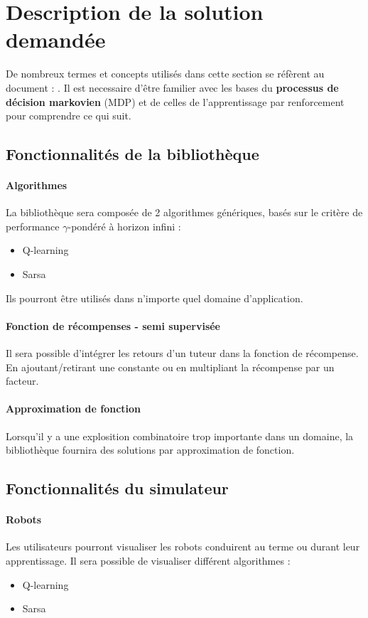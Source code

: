 \documentclass[a4paper,12pt]{article}
\begin{document}
  \vfill

  \newpage 
  \section{Description de la solution demandée}
	De nombreux termes et concepts utilisés dans cette section se réfèrent au document : \cite{PDMIA}. 
	Il est necessaire d'être familier avec les bases du \textbf{processus de décision markovien} (MDP) et de celles 
	de l'apprentissage par renforcement pour comprendre ce qui suit.
	\subsection{Fonctionnalités de la bibliothèque}
		\paragraph{Algorithmes} La bibliothèque sera composée de 2 algorithmes génériques, basés sur le critère 
		de performance $\gamma$-pondéré à horizon infini : 
		  \begin{itemize}
			  \item Q-learning
			  \item Sarsa
		  \end{itemize}
		 Ils pourront être utilisés dans n'importe quel domaine d'application.
		  
		\paragraph{Fonction de récompenses - semi supervisée} Il sera possible d'intégrer les retours d'un 
			tuteur dans la fonction de récompense. En ajoutant/retirant une constante 
			ou en multipliant la récompense par un facteur.
		\paragraph{Approximation de fonction} Lorsqu'il y a une explosition combinatoire trop importante dans
		un domaine, la bibliothèque fournira des solutions par approximation de fonction.

	\subsection{Fonctionnalités du simulateur}
		\paragraph{Robots} Les utilisateurs pourront visualiser les robots conduirent au terme ou durant leur
		apprentissage. Il sera possible de visualiser différent algorithmes :
		    \begin{itemize}
		      \item Q-learning
		      \item Sarsa
		    \end{itemize}
\end{document}

